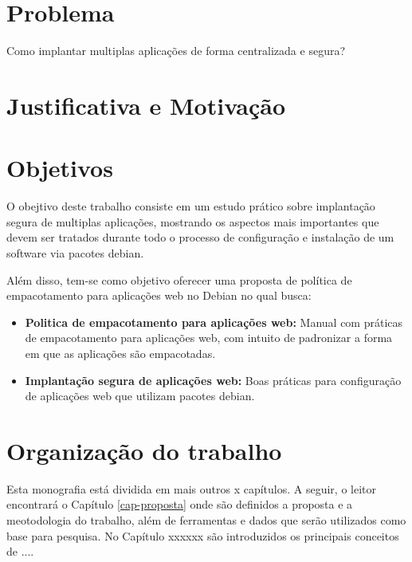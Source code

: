\section{Problema}
%

Como implantar multiplas aplicações de forma centralizada e segura?

\section{Justificativa e Motivação}


\section{Objetivos}

%

O obejtivo deste trabalho consiste em um estudo prático sobre implantação segura
de multiplas aplicações, mostrando os aspectos mais importantes que devem ser
tratados durante todo o processo de configuração e instalação de um software via
pacotes debian.

%

Além disso, tem-se como objetivo oferecer uma proposta de política de
empacotamento para aplicações web no Debian no qual busca:

\begin{itemize}
  \item  \textbf{Politica de empacotamento para aplicações web:} Manual com
  práticas de empacotamento para aplicações web, com intuito de padronizar a
  forma em que as aplicações são empacotadas.
  \item  \textbf{Implantação segura de aplicações web:} Boas práticas para
  configuração de aplicações web que utilizam pacotes debian.
\end{itemize}

\section{Organização do trabalho}

%

Esta monografia está dividida em mais outros x capítulos. A seguir, o leitor
encontrará o Capítulo \ref{cap-proposta} onde são definidos a proposta e
a meotodologia do trabalho, além de ferramentas e dados que serão utilizados
como base para pesquisa. No Capítulo xxxxxx
são introduzidos os principais conceitos de  ....

